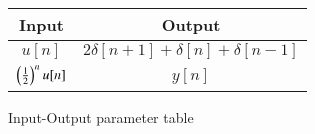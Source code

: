 \centering
\begin{tabular}{|c|c|}
        \hline
        \textbf{Input} & \textbf{Output} \\
        \hline
        $u[n]$ & $2\delta[n+1]+\delta[n]+\delta[n-1]$ \\ 
	\hline
	$\left(\frac{1}{2}\right)^nu[n]$ & $y[n]$  \\ 
        \hline
\end{tabular}
\caption{Input-Output parameter table}
\label{tab:gate.2023.ec.40.1}




